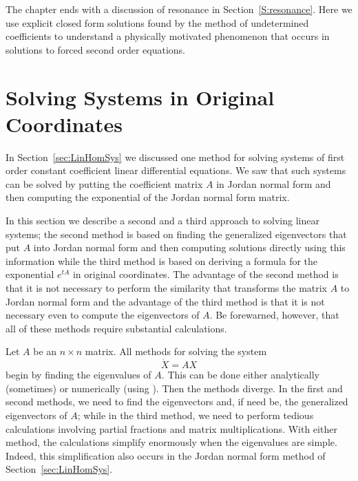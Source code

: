 \documentclass{ximera}
\begin{document}
The chapter ends with a discussion of resonance in Section~\ref{S:resonance}. 
Here we use explicit closed form solutions found by the method of 
undetermined coefficients to understand a physically motivated phenomenon 
that occurs in solutions to forced second order equations.  


\section{Solving Systems in Original Coordinates}
\label{S:SEOC}

In Section~\ref{sec:LinHomSys} we discussed one method for solving systems of 
first order constant coefficient linear differential equations.   We saw that 
such systems can be solved by putting the coefficient matrix $A$ in Jordan 
normal form and then computing the exponential of the Jordan normal form 
matrix.  

In this section we describe a second and a third approach to solving linear 
systems; the second method is based on finding the generalized eigenvectors 
that put $A$ into Jordan normal form and then
computing solutions directly using this information while the third method is 
based on deriving a formula for the exponential 
$e^{tA}$ in original coordinates.  The advantage of the second method is
that it is not necessary to perform the similarity that transforms the matrix 
$A$ to Jordan normal form and the advantage of the third method is that it is 
not necessary even to compute the eigenvectors of $A$.  Be forewarned,
however, that all of these methods require substantial calculations.

Let $A$ be an $n\times n$ matrix.  All methods for solving the system 
\begin{equation} \label{dotX=AX}
\dot{X}=AX
\end{equation}
begin by finding the eigenvalues of $A$.  This can be done 
either analytically (sometimes) or numerically (using \Matlabp). Then the  
methods diverge.  In the first and second methods, we need to find the 
eigenvectors and, if need be, the generalized eigenvectors
 of $A$; while in the third method, we need to 
perform tedious calculations involving partial fractions and matrix 
multiplications.  With either method, the calculations simplify enormously 
when the eigenvalues are simple.  Indeed, this simplification also occurs in 
the Jordan normal form method of Section~\ref{sec:LinHomSys}.
\end{document}
